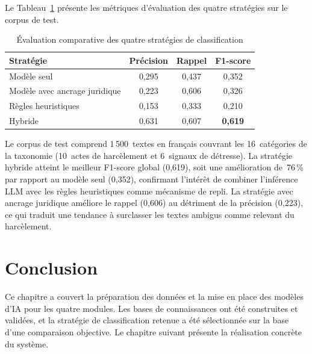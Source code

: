 Le Tableau~\ref{tab:eval_classif} présente les métriques d'évaluation
des quatre stratégies sur le corpus de test.

\vspace{6pt}
\begin{table}[H]
\centering
\caption{Évaluation comparative des quatre stratégies de classification}
\label{tab:eval_classif}
\begin{tabular}{|l|c|c|c|}
\hline
\textbf{Stratégie} & \textbf{Précision} & \textbf{Rappel} & \textbf{F1-score} \\
\hline
Modèle seul                   & 0,295 & 0,437 & 0,352 \\
\hline
Modèle avec ancrage juridique & 0,223 & 0,606 & 0,326 \\
\hline
Règles heuristiques           & 0,153 & 0,333 & 0,210 \\
\hline
Hybride                       & 0,631 & 0,607 & \textbf{0,619} \\
\hline
\end{tabular}
\end{table}

Le corpus de test comprend 1\,500~textes en français couvrant les 16~catégories
de la taxonomie (10~actes de harcèlement et 6~signaux de détresse).
La stratégie hybride atteint le meilleur F1-score global (0,619),
soit une amélioration de~76\,\% par rapport au modèle seul (0,352),
confirmant l'intérêt de combiner l'inférence LLM avec les règles heuristiques
comme mécanisme de repli.
La stratégie avec ancrage juridique améliore le rappel (0,606) au détriment
de la précision (0,223), ce qui traduit une tendance à surclasser les textes
ambigus comme relevant du harcèlement.

\section*{Conclusion}

Ce chapitre a couvert la préparation des données et la mise en place des modèles d'IA
pour les quatre modules. Les bases de connaissances ont été construites et validées,
et la stratégie de classification retenue a été sélectionnée sur la base
d'une comparaison objective. Le chapitre suivant présente la réalisation concrète du système.
